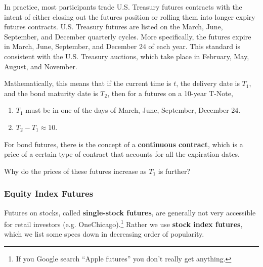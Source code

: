 \documentclass{article}
\begin{document}
      In practice, most participants trade U.S. Treasury futures contracts with the intent of either closing out the futures position or rolling them into longer expiry futures contracts. U.S. Treasury futures are listed on the March, June, September, and December quarterly cycles. More specifically, the futures expire in March, June, September, and December 24 of each year. This standard is consistent with the U.S. Treasury auctions, which take place in February, May, August, and November. 

      \begin{example}
        \label{ex:bond-futures-standards}
        Mathematically, this means that if the current time is $t$, the delivery date is $T_1$, and the bond maturity date is $T_2$, then for a futures on a 10-year T-Note, 
        \begin{enumerate}
          \item $T_1$ must be in one of the days of March, June, September, December 24. 
          \item $T_2 - T_1 \approx 10$. 
        \end{enumerate}
      \end{example}

      For bond futures, there is the concept of a \textbf{continuous contract}, which is a price of a certain type of contract that accounts for all the expiration dates. 

      \begin{question}
        Why do the prices of these futures increase as $T_1$ is further? 
      \end{question}

    \subsubsection{Equity Index Futures}

      Futures on stocks, called \textbf{single-stock futures}, are generally not very accessible for retail investors (e.g. OneChicago).\footnote{If you Google search ``Apple futures'' you don't really get anything. } Rather we use \textbf{stock index futures}, which we list some specs down in decreasing order of popularity. 
\end{document}
